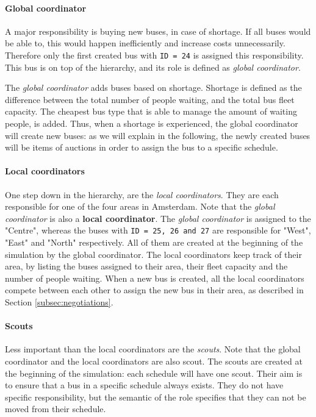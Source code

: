 \paragraph{Global coordinator}

A major responsibility is buying new buses, in case of shortage. If all buses would be able to, this would happen inefficiently and increase costs unnecessarily. Therefore only the first created bus with \texttt{ID = 24} is assigned this responsibility. This bus is on top of the hierarchy, and its role is defined as \textit{global coordinator}. 

The \textit{global coordinator} adds buses based on shortage. Shortage is defined as the difference between the total number of people waiting, and the total bus fleet capacity. The cheapest bus type that is able to manage the amount of waiting people, is added. Thus, when a shortage is experienced, the global coordinator will create new buses: as we will explain in the following, the newly created buses will be items of auctions in order to assign the bus to a specific schedule.

\paragraph{Local coordinators}

One step down in the hierarchy, are the \textit{local coordinators}. They are each responsible for one of the four areas in Amsterdam. Note that the \textit{global coordinator} is also a \textbf{local coordinator}. The \textit{global coordinator} is assigned to the "Centre", whereas the buses with \texttt{ID = 25, 26 and 27} are responsible for "West", "East" and "North" respectively. All of them are created at the beginning of the simulation by the global coordinator. The local coordinators keep track of their area, by listing the buses assigned to their area, their fleet capacity and the number of people waiting. When a new bus is created, all the local coordinators compete between each other to assign the new bus in their area, as described in Section \ref{subsec:negotiations}.

\paragraph{Scouts}

Less important than the local coordinators are the \textit{scouts}. Note that the global coordinator and the local coordinators are also scout. The scouts are created at the beginning of the simulation: each schedule will have one scout. Their aim is to ensure that a bus in a specific schedule always exists. They do not have specific responsibility, but the semantic of the role specifies that they can not be moved from their schedule. 

